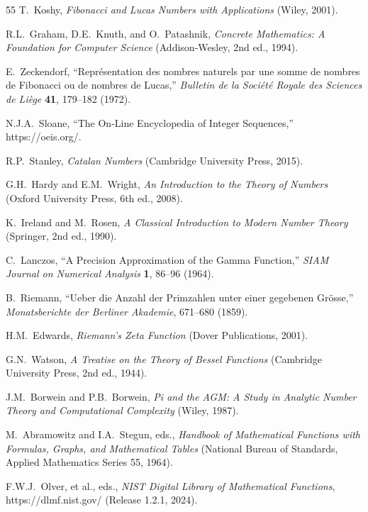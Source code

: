 \documentclass[aps,prd,preprint,superscriptaddress,showpacs,nofootinbib,longbibliography]{revtex4-2}
\begin{document}
\begin{thebibliography}{55}
T.~Koshy,
\textit{Fibonacci and Lucas Numbers with Applications} (Wiley, 2001).

R.L.~Graham, D.E.~Knuth, and O.~Patashnik,
\textit{Concrete Mathematics: A Foundation for Computer Science} (Addison-Wesley, 2nd ed., 1994).

E.~Zeckendorf,
``Repr\'esentation des nombres naturels par une somme de nombres de Fibonacci ou de nombres de Lucas,''
\textit{Bulletin de la Soci\'et\'e Royale des Sciences de Li\`ege} \textbf{41}, 179--182 (1972).

N.J.A.~Sloane,
``The On-Line Encyclopedia of Integer Sequences,''
https://oeis.org/.

R.P.~Stanley,
\textit{Catalan Numbers} (Cambridge University Press, 2015).

G.H.~Hardy and E.M.~Wright,
\textit{An Introduction to the Theory of Numbers} (Oxford University Press, 6th ed., 2008).

K.~Ireland and M.~Rosen,
\textit{A Classical Introduction to Modern Number Theory} (Springer, 2nd ed., 1990).

C.~Lanczos,
``A Precision Approximation of the Gamma Function,''
\textit{SIAM Journal on Numerical Analysis} \textbf{1}, 86--96 (1964).

B.~Riemann,
``Ueber die Anzahl der Primzahlen unter einer gegebenen Gr\"osse,''
\textit{Monatsberichte der Berliner Akademie}, 671--680 (1859).

H.M.~Edwards,
\textit{Riemann's Zeta Function} (Dover Publications, 2001).

G.N.~Watson,
\textit{A Treatise on the Theory of Bessel Functions} (Cambridge University Press, 2nd ed., 1944).

J.M.~Borwein and P.B.~Borwein,
\textit{Pi and the AGM: A Study in Analytic Number Theory and Computational Complexity} (Wiley, 1987).

M.~Abramowitz and I.A.~Stegun, eds.,
\textit{Handbook of Mathematical Functions with Formulas, Graphs, and Mathematical Tables} (National Bureau of Standards, Applied Mathematics Series 55, 1964).

F.W.J.~Olver, et al., eds.,
\textit{NIST Digital Library of Mathematical Functions}, https://dlmf.nist.gov/ (Release 1.2.1, 2024).


\end{thebibliography}
\end{document}
